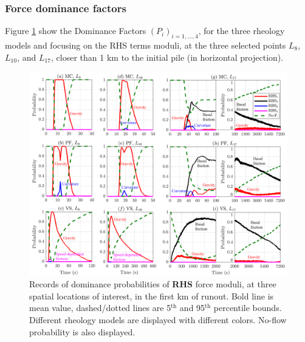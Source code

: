\documentclass{article}
\begin{document}
\subsubsection{Force dominance factors}\label{stat2}
Figure \ref{fig:Colima-Pr1} show the Dominance Factors $(P_i)_{i=1,\dots,4}$, for the three rheology models and focusing on the RHS terms moduli, at the three selected points $L_{8}$, $L_{10}$, and $L_{17}$, closer than 1 km to the initial pile (in horizontal projection).
\begin{figure}[H]
         \centering
        \includegraphics[width=1\textwidth]{BAF_VolcanDeColima/ForceContrib/Pr1_total.png}
        \caption{Records of dominance probabilities of \textbf{RHS} force moduli, at three spatial locations of interest, in the first km of runout. Bold line is mean value, dashed/dotted lines are 5$^{\mathrm{th}}$ and 95$^{\mathrm{th}}$ percentile bounds. Different rheology models are displayed with different colors. No-flow probability is also displayed.}
        \label{fig:Colima-Pr1}
\end{figure}
\end{document}
